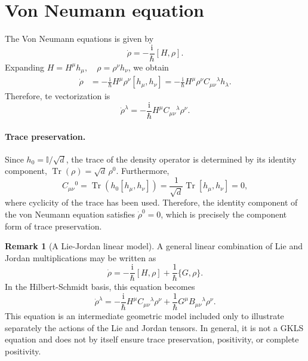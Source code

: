 \documentclass[notitlepage,aip,reprint,onecolumn]{revtex4-1}
\theoremstyle{definition}
\newtheorem{remark}[theorem]{Remark}
\renewcommand{\comm}[2]{\left[#1,#2\right]}
\begin{document}
\section{Von Neumann equation}\label{Sec:von Neumann equation}
The Von Neumann equations is given by
\begin{equation}
     \dot\rho=-\frac{\mathrm{i}}{\hbar}\comm{H}{\rho}.
\end{equation}
Expanding \(H=H^\mu h_\mu, \quad \rho=\rho^\nu h_\nu\), we obtain
\begin{align*}
     \dot\rho
     &=-\frac{\mathrm{i}}{\hbar}H^\mu\rho^\nu\comm{h_\mu}{h_\nu}=-\frac{\mathrm{i}}{\hbar}H^\mu\rho^\nu C_{\mu\nu}{}^\lambda h_\lambda.
\end{align*}
Therefore, te vectorization is
\begin{equation} \label{eq:von-neumann-components}
     \dot\rho^\lambda=-\frac{\mathrm{i}}{\hbar}H^\mu C_{\mu\nu}{}^\lambda\rho^\nu.
\end{equation}

\paragraph{Trace preservation.}
Since \(h_0=\mathbb I/\sqrt d\), the trace of the density operator is determined by its identity component, \(\operatorname{Tr}(\rho)=\sqrt d\,\rho^0\). Furthermore,
\[
    C_{\mu\nu}{}^0
    =
    \operatorname{Tr}\!\left(
    h_0[h_\mu,h_\nu]
    \right)
    =
    \frac1{\sqrt d}
    \operatorname{Tr}[h_\mu,h_\nu]
    =
    0,
\]
where cyclicity of the trace has been used. Therefore, the identity component of the von Neumann equation satisfies \( \dot\rho^0=0\), which is precisely the component form of trace preservation.

\begin{remark}[A Lie-Jordan linear model]
A general linear combination of Lie and Jordan multiplications may be written as
\[
    \dot\rho
    =
    -\frac{\mathrm{i}}{\hbar}[H,\rho]
    +
    \frac1{\hbar}\{G,\rho\}.
\]
In the Hilbert-Schmidt basis, this equation becomes
\[
    \dot\rho^\lambda
    =
    -\frac{\mathrm{i}}{\hbar}
    H^\mu C_{\mu\nu}{}^\lambda\rho^\nu
    +
    \frac1{\hbar}
    G^\mu B_{\mu\nu}{}^\lambda\rho^\nu.
\]
This equation is an intermediate geometric model included only to illustrate separately the actions of the Lie and Jordan tensors. In general, it is not a GKLS equation and does not by itself ensure trace preservation, positivity, or complete positivity.
\end{remark}
\end{document}
